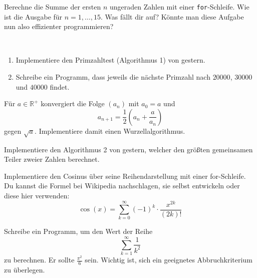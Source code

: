 \documentclass{uebungszettel}
\begin{document}
\begin{aufg}
Berechne die Summe der ersten $n$ ungeraden Zahlen mit einer \texttt{for}-Schleife. Wie ist die Ausgabe für $n = 1, \ldots ,15$. Was fällt dir auf? Könnte man diese Aufgabe nun also effizienter programmieren?
\end{aufg}

\begin{aufg}~
\begin{enumerate}
\item Implementiere den Primzahltest (Algorithmus 1) von gestern.
\item Schreibe ein Programm, dass jeweils die nächste Primzahl nach $20000$, $30000$ und $40000$ findet.
\end{enumerate}
\end{aufg}

\begin{aufg}
Für $a \in \mathbb{R}^+$ konvergiert die Folge $(a_n)$ mit $a_0 = a$ und
\[ a_{n+1} = \frac{1}{2}\left(a_n + \frac{a}{a_n}\right) \]
gegen $\sqrt{a}$. Implementiere damit einen Wurzellalgorithmus.
\end{aufg}

\begin{aufg}
Implementiere den Algorithmus 2 von gestern, welcher den größten gemeinsamen Teiler zweier Zahlen berechnet.
\end{aufg}

\begin{aufg}
Implementiere den Cosinus über seine Reihendarstellung mit einer for-Schleife. Du kannst die Formel bei Wikipedia nachschlagen, sie selbst entwickeln oder diese hier verwenden:
\[ \cos(x) = \sum_{k = 0}^{\infty}{(-1)^k \cdot \frac{x^{2k}}{(2k)!}} \]
\end{aufg}

\begin{aufg}
Schreibe ein Programm, um den Wert der Reihe
\[ \sum_{k = 1}^\infty \frac{1}{k^2} \]
zu berechnen. Er sollte $\frac{\pi^2}{6}$ sein. Wichtig ist, sich ein geeignetes Abbruchkriterium zu überlegen.
\end{aufg}
\end{document}
